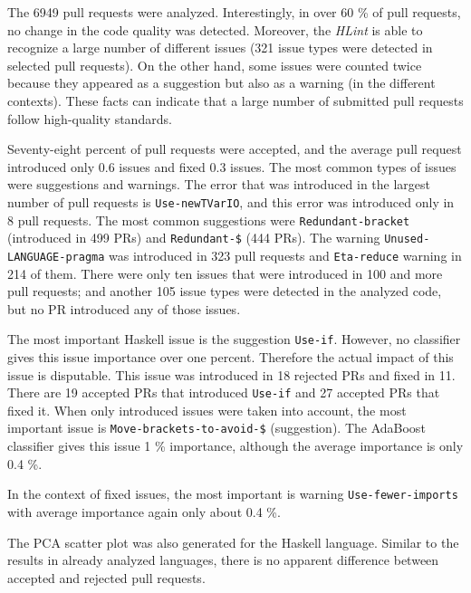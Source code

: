 \documentclass[digital,oneside,oldtable,nolof,nolot,nocover]{fithesis4}
\begin{document}
The 6949 pull requests were analyzed. Interestingly, in over 60
\% of pull requests, no change in the code quality was detected. Moreover, the
\emph{HLint} is able to recognize a large number of different issues (321 issue
types were detected in selected pull requests). On the other hand, some issues
were counted twice because they appeared as a suggestion but also as a warning
(in the different contexts).
These facts can indicate that a large
number of submitted pull requests follow high-quality standards.

Seventy-eight percent of pull requests were accepted, and the average pull request introduced
only 0.6 issues and fixed 0.3 issues. The most common types of issues were suggestions
and warnings. The error that was introduced in the largest number of pull requests is
\texttt{Use-newTVarIO}, and this error was introduced only in 8 pull requests. The most common
suggestions were \texttt{Redundant-bracket} (introduced in 499 PRs) and \texttt{Redundant-\$} (444 PRs).
The warning \texttt{Unused-LANGUAGE-pragma} was introduced in 323 pull requests and \texttt{Eta-reduce}
warning in 214 of them. There were only ten issues that were introduced in 100 and more
pull requests; and another 105 issue types were detected in the analyzed code, but no PR introduced
any of those issues.

The most important Haskell issue is the suggestion \texttt{Use-if}. However, no classifier gives this
issue importance over one percent. Therefore the actual impact of this issue is disputable.
This issue was introduced in 18 rejected PRs and fixed in 11. There are 19 accepted PRs that
introduced \texttt{Use-if} and 27 accepted PRs that fixed it.
When only introduced issues were taken into account, the most important issue is \texttt{Move-brackets-to-avoid-\$} (suggestion).
The AdaBoost classifier gives this issue 1 \% importance, although the average importance is only 0.4 \%.

In the context of fixed issues, the most important is warning \texttt{Use-fewer-imports} with average importance again only about 0.4 \%.

The PCA scatter plot was also generated for the Haskell language.
Similar to the results in already analyzed languages, there is no apparent
difference between accepted and rejected pull requests.
\end{document}
